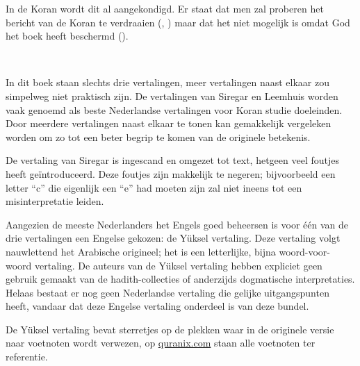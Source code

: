 In de Koran wordt dit al aangekondigd.  Er staat dat men zal proberen het bericht van de Koran te verdraaien (, ) maar dat het niet mogelijk is omdat God het boek heeft beschermd ().
\vspace{0.3cm}

\newpage
\mbox{~}
\vspace{3cm}

\noindent In dit boek staan slechts drie vertalingen, meer vertalingen naast elkaar zou simpelweg niet praktisch zijn.  De vertalingen van Siregar en Leemhuis worden vaak genoemd als beste Nederlandse vertalingen voor Koran studie doeleinden.  Door meerdere vertalingen naast elkaar te tonen kan gemakkelijk vergeleken worden om zo tot een beter begrip te komen van de originele betekenis.

De vertaling van Siregar is ingescand en omgezet tot text, hetgeen veel foutjes heeft geïntroduceerd.  Deze foutjes zijn makkelijk te negeren; bijvoorbeeld een letter ``c'' die eigenlijk een ``e'' had moeten zijn zal niet ineens tot een misinterpretatie leiden.

Aangezien de meeste Nederlanders het Engels goed beheersen is voor één van de drie vertalingen een Engelse gekozen: de Yüksel vertaling.  Deze vertaling volgt nauwlettend het Arabische origineel; het is een letterlijke, bijna woord-voor-woord vertaling.  De auteurs van de Yüksel vertaling hebben expliciet geen gebruik gemaakt van de hadith-collecties of anderzijds dogmatische interpretaties.  Helaas bestaat er nog geen Nederlandse vertaling die gelijke uitgangspunten heeft, vandaar dat deze Engelse vertaling onderdeel is van deze bundel.

De Yüksel vertaling bevat sterretjes op de plekken waar in de originele versie naar voetnoten wordt verwezen, op \href{http://quranix.com}{quranix.com} staan alle voetnoten ter referentie.
\vspace{0.3cm}

